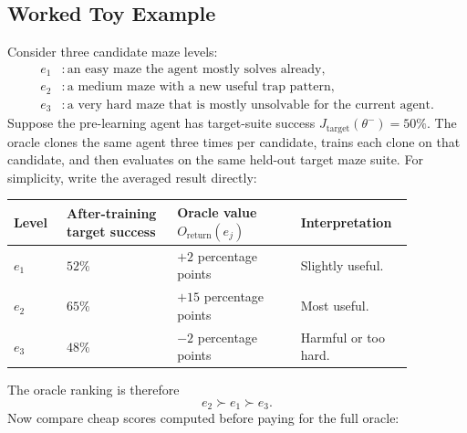 \documentclass[11pt]{article}
\begin{document}
\subsection{Worked Toy Example}

Consider three candidate maze levels:
\begin{align*}
  e_1 &: \text{an easy maze the agent mostly solves already}, \\
  e_2 &: \text{a medium maze with a new useful trap pattern}, \\
  e_3 &: \text{a very hard maze that is mostly unsolvable for the current agent}.
\end{align*}
Suppose the pre-learning agent has target-suite success
$J_{\mathrm{target}}(\theta^-)=50\%$. The oracle clones the same agent three
times per candidate, trains each clone on that candidate, and then evaluates on
the same held-out target maze suite. For simplicity, write the averaged result
directly:

\begin{center}
\small
\begin{tabular}{
  >{\raggedright\arraybackslash}p{0.12\linewidth}
  >{\raggedright\arraybackslash}p{0.25\linewidth}
  >{\raggedright\arraybackslash}p{0.28\linewidth}
  >{\raggedright\arraybackslash}p{0.22\linewidth}
}
\toprule
Level & After-training target success & Oracle value
$O_{\mathrm{return}}(e_j)$ & Interpretation \\
\midrule
$e_1$ & $52\%$ & $+2$ percentage points & Slightly useful. \\
$e_2$ & $65\%$ & $+15$ percentage points & Most useful. \\
$e_3$ & $48\%$ & $-2$ percentage points & Harmful or too hard. \\
\bottomrule
\end{tabular}
\end{center}

The oracle ranking is therefore
\begin{equation}
  e_2 \succ e_1 \succ e_3.
\end{equation}
Now compare cheap scores computed before paying for the full oracle:
\end{document}
